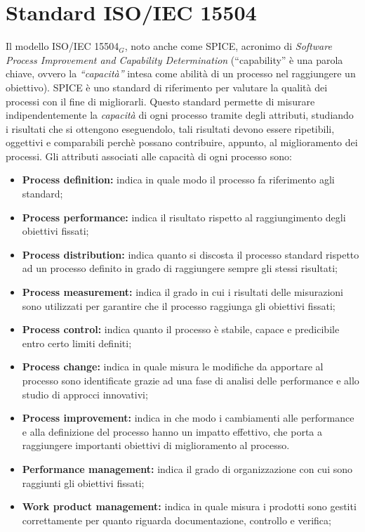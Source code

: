\chapter{Standard ISO/IEC 15504}\label{Standard ISO/IEC 15504}
Il modello ISO/IEC 15504$_G$, noto anche come SPICE, acronimo di \textit{Software Process Improvement and Capability Determination} (“capability” è una parola chiave, ovvero la \textit{“capacità”} intesa come abilità di un processo nel raggiungere un obiettivo).
SPICE è uno standard di riferimento per valutare la qualità dei processi con il fine di migliorarli.
Questo standard permette di misurare indipendentemente la \textit{capacità} di ogni processo tramite degli attributi, studiando i risultati che si ottengono eseguendolo, tali risultati devono essere ripetibili, oggettivi e comparabili perchè possano contribuire, appunto, al miglioramento dei processi.
Gli attributi associati alle capacità di ogni processo sono:
\begin{itemize}
	\item \textbf{Process definition:} indica in quale modo il processo fa riferimento agli standard;
	\item \textbf{Process performance:} indica il risultato rispetto al raggiungimento degli 
		obiettivi fissati;
	\item \textbf{Process distribution:} indica quanto si discosta il processo standard rispetto ad un processo 
		definito in grado di raggiungere sempre gli stessi risultati; 
	\item \textbf{Process measurement:} indica il grado in cui i risultati delle misurazioni
		sono utilizzati per garantire che il processo raggiunga gli obiettivi fissati;
	\item \textbf{Process control:} indica quanto il processo è stabile, capace e predicibile 
		entro certo limiti definiti;
	\item \textbf{Process change:} indica in quale misura le modifiche da apportare al processo sono
	identificate grazie ad una fase di analisi delle performance e allo studio di approcci innovativi;
	\item \textbf{Process improvement:} indica in che modo i cambiamenti alle performance e alla definizione del processo 
		hanno un impatto effettivo, che porta a raggiungere importanti obiettivi di miglioramento al processo.
	\item \textbf{Performance management:} indica il grado di organizzazione con cui sono raggiunti gli obiettivi fissati;
	\item \textbf{Work product management:} indica in quale misura i prodotti sono gestiti correttamente per quanto riguarda documentazione, controllo e verifica;
\end{itemize}

